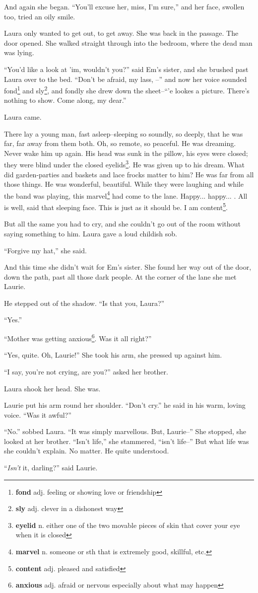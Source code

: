 And again she began. ``You'll excuse her, miss, I'm sure,'' and her face, swollen too, tried an oily smile.

Laura only wanted to get out, to get away. She was back in the passage. The door opened. She walked straight through into the bedroom, where the dead man was lying.

``You'd like a look at 'im, wouldn't you?'' said Em's sister, and she brushed past Laura over to the bed. ``Don't be afraid, my lass, --'' and now her voice sounded fond\footnote{\textbf{fond} adj. feeling or showing love or friendship} and sly\footnote{\textbf{sly} adj. clever in a dishonest way}, and fondly she drew down the sheet--``'e lookes a picture. There's nothing to show. Come along, my dear.''

Laura came.

There lay a young man, fast asleep--sleeping so soundly, so deeply, that he was far, far away from them both. Oh, so remote, so peaceful. He was dreaming. Never wake him up again. His head was sunk in the pillow, his eyes were closed; they were blind under the closed eyelids\footnote{\textbf{eyelid} n. either one of the two movable pieces of skin that cover your eye when it is closed}. He was given up to his dream. What did garden-parties and baskets and lace frocks matter to him? He was far from all those things. He was wonderful, beautiful. While they were laughing and while the band was playing, this marvel\footnote{\textbf{marvel} n. someone or sth that is extremely good, skillful, etc.} had come to the lane. Happy... happy... . All is well, said that sleeping face. This is just as it should be. I am content\footnote{\textbf{content} adj. pleased and satisfied}.

But all the same you had to cry, and she couldn't go out of the room without saying something to him. Laura gave a loud childish sob.

``Forgive my hat,'' she said.

And this time she didn't wait for Em's sister. She found her way out of the door, down the path, past all those dark people. At the corner of the lane she met Laurie.

He stepped out of the shadow. ``Is that you, Laura?''

``Yes.''

``Mother was getting anxious\footnote{\textbf{anxious} adj. afraid or nervous especially about what may happen}. Was it all right?''

``Yes, quite. Oh, Laurie!'' She took his arm, she pressed up against him.

``I say, you're not crying, are you?'' asked her brother.

Laura shook her head. She was.

Laurie put his arm round her shoulder. ``Don't cry.'' he said in his warm, loving voice. ``Was it awful?''

``No.'' sobbed Laura. ``It was simply marvellous. But, Laurie--'' She stopped, she looked at her brother. ``Isn't life,'' she stammered, ``isn't life--'' But what life was she couldn't explain. No matter. He quite understood.

``\textit{Isn't} it, darling?'' said Laurie.
